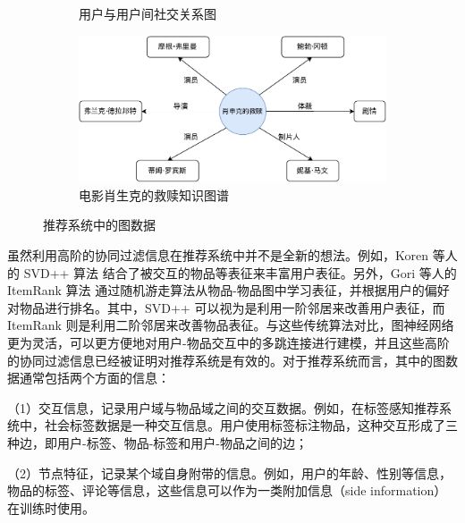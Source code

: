 \begin{figure}
\begin{subfigure}{0.45\linewidth}
        \caption{用户与用户间社交关系图}
        \label{tag:ui-social}
    \end{subfigure}
    \begin{subfigure}{0.45\linewidth}
        \centering
        \includegraphics[width=.95\linewidth]{figure/ssk.drawio.pdf}
        \caption{电影肖生克的救赎知识图谱}
        \label{tag:ssk-kg}
    \end{subfigure} 
    \caption{推荐系统中的图数据}
    \label{tag:rs-data}
\end{figure}

虽然利用高阶的协同过滤信息在推荐系统中并不是全新的想法。例如，Koren 等人的 SVD++ 算法\cite{koren_factorization_2008} 结合了被交互的物品等表征来丰富用户表征。另外，Gori 等人的 ItemRank 算法\cite{gori_itemrank_nodate} 通过随机游走算法从物品-物品图中学习表征，并根据用户的偏好对物品进行排名。其中，SVD++ 可以视为是利用一阶邻居来改善用户表征，而 ItemRank 则是利用二阶邻居来改善物品表征。与这些传统算法对比，图神经网络更为灵活，可以更方便地对用户-物品交互中的多跳连接进行建模，并且这些高阶的协同过滤信息已经被证明对推荐系统是有效的\cite{wu_graph_2022}。对于推荐系统而言，其中的图数据通常包括两个方面的信息：

（1）交互信息，记录用户域与物品域之间的交互数据。例如，在标签感知推荐系统中，社会标签数据是一种交互信息。用户使用标签标注物品，这种交互形成了三种边，即用户-标签、物品-标签和用户-物品之间的边；

（2）节点特征，记录某个域自身附带的信息。例如，用户的年龄、性别等信息，物品的标签、评论等信息，这些信息可以作为一类附加信息（side information）在训练时使用。

